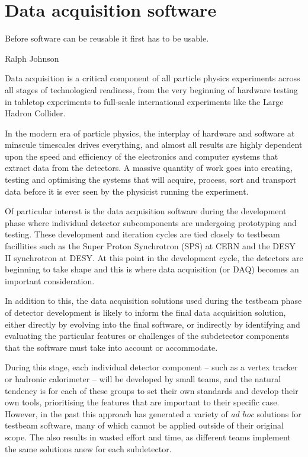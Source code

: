 \chapter{Data acquisition software}

\epigraph{Before software can be reusable it first has to be usable.}{Ralph Johnson}

Data acquisition is a critical component of all particle physics experiments across all stages of technological readiness, from the very beginning of hardware testing in tabletop experiments to full-scale international experiments like the Large Hadron Collider. 

In the modern era of particle physics, the interplay of hardware and software at minscule timescales drives everything, and almost all results are highly dependent upon the speed and efficiency of the electronics and computer systems that extract data from the detectors. A massive quantity of work goes into creating, testing and optimising the systems that will acquire, process, sort and transport data before it is ever seen by the physicist running the experiment.

Of particular interest is the data acquisition software during the development phase where individual detector subcomponents are undergoing prototyping and testing. These development and iteration cycles are tied closely to testbeam facillities such as the Super Proton Synchrotron (SPS) at CERN and the DESY II synchrotron at DESY. At this point in the development cycle, the detectors are beginning to take shape and this is where data acquisition (or DAQ) becomes an important consideration. 

In addition to this, the data acquisition solutions used during the testbeam phase of detector development is likely to inform the final data acquisition solution, either directly by evolving into the final software, or indirectly by identifying and evaluating the particular features or challenges of the subdetector components that the software must take into account or accommodate.

During this stage, each individual detector component -- such as a vertex tracker or hadronic calorimeter -- will be developed by small teams, and the natural tendency is for each of these groups to set their own standards and develop their own tools, prioritising the features that are important to their specific case. However, in the past this approach has generated a variety of \textit{ad hoc} solutions for testbeam software, many of which cannot be applied outside of their original scope. The also results in wasted effort and time, as different teams implement the same solutions anew for each subdetector.

